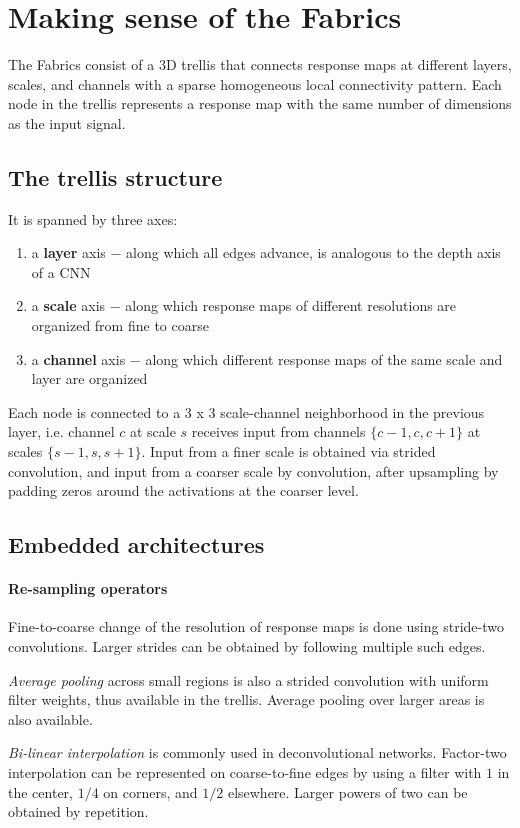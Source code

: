 \documentclass[a4paper,twocolumn]{article}
\begin{document}
\section{Making sense of the Fabrics}
The Fabrics consist of a 3D trellis that connects response maps at different layers, scales, and channels with a sparse homogeneous local connectivity pattern.
Each node in the trellis represents a response map with the same number of dimensions as the input signal.

\subsection{The trellis structure}
It is spanned by three axes:
\begin{enumerate}
    \item a \textbf{layer} axis $-$ along which all edges advance, is analogous to the depth axis of a CNN
    \item a \textbf{scale} axis $-$ along which response maps of different resolutions are organized from fine to coarse
    \item a \textbf{channel} axis $-$ along which different response maps of the same scale and layer are organized
\end{enumerate}

Each node is connected to a 3 x 3 scale-channel neighborhood in the previous layer, i.e. channel $c$ at scale $s$ receives input from channels $\{c-1, c, c+1\}$ at scales $\{s-1, s, s+1\}$. Input from a finer scale is obtained via strided convolution, and input from a coarser scale by convolution, after upsampling by padding zeros around the activations at the coarser level.

\subsection{Embedded architectures}
\paragraph{Re-sampling operators}
Fine-to-coarse change of the resolution of response maps is done using stride-two convolutions. Larger strides can be obtained by following multiple such edges.

\textit{Average pooling} across small regions is also a strided convolution with uniform filter weights, thus available in the trellis. Average pooling over larger areas is also available.

\textit{Bi-linear interpolation} is commonly used in deconvolutional networks. Factor-two interpolation can be represented on coarse-to-fine edges by using a filter with $1$ in the center, $1/4$ on corners, and $1/2$ elsewhere. Larger powers of two can be obtained by repetition.
\end{document}
